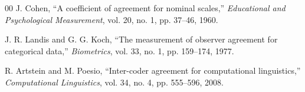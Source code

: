\documentclass[conference]{IEEEtran}
\begin{document}
\begin{thebibliography}{00}
J. Cohen, ``A coefficient of agreement for nominal scales,''
\textit{Educational and Psychological Measurement}, vol. 20, no. 1,
pp. 37--46, 1960.

J. R. Landis and G. G. Koch, ``The measurement of observer agreement
for categorical data,'' \textit{Biometrics}, vol. 33, no. 1,
pp. 159--174, 1977.

R. Artstein and M. Poesio, ``Inter-coder agreement for computational
linguistics,'' \textit{Computational Linguistics}, vol. 34, no. 4,
pp. 555--596, 2008.

\end{thebibliography}
\endgroup
\end{document}
